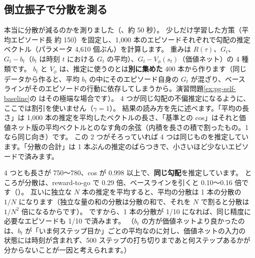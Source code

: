\subsection*{倒立振子で分散を測る}

本当に分散が減るのかを測りました（、約 50 秒）。
少しだけ学習した方策（平均エピソード長 約 150）を固定し、1,000 本のエピソードそれぞれで勾配の推定ベクトル（パラメータ 4,610 個ぶん）を計算します。
重みは $R(\tau)$、$G_t$、$G_t-b_t$（$b_t$ は時刻 $t$ における $G_t$ の平均）、$G_t-V_\phi(s_t)$（価値ネット）の 4 種類です。
$b_t$ と $V_\phi$ は、推定に使うのとは\textbf{別に集めた} 400 本から作ります（同じデータから作ると、平均 $b_t$ の中にそのエピソード自身の $G_t$ が混ざり、ベースラインがそのエピソードの行動に依存してしまうから。演習問題\ref{ex:pg-self-baseline}の  はその極端な場合です）。
4 つが同じ勾配の不偏推定になるように、ここでは割引を使いません（$\gamma=1$）。
結果の読み方を先に述べます。「平均の長さ」は 1,000 本の推定を平均したベクトルの長さ、「基準との cos」はそれと価値ネット版の平均ベクトルとのなす角の余弦（内積を長さの積で割ったもの。1 なら同じ向き）です。
この 2 つがそろっていれば 4 つは同じものを推定しています。「分散の合計」は 1 本ぶんの推定のばらつきで、小さいほど少ないエピソードで済みます。


4 つとも長さが 750〜780、cos が 0.998 以上で、\textbf{同じ勾配}を推定しています。
ところが分散は、reward-to-go で 0.29 倍、ベースラインを引くと 0.10〜0.16 倍です（）。
互いに独立な $N$ 本の推定を平均すると、平均の分散は 1 本の分散の $1/N$ になります（独立な量の和の分散は分散の和で、それを $N$ で割ると分散は $1/N^2$ 倍になるからです）。
ですから、1 本の分散が 1/10 になれば、同じ精度に必要なエピソードも 1/10 で済みます。
（$b_t$ の方が価値ネットより良かったのは、$b_t$ が「いま何ステップ目か」ごとの平均なのに対し、価値ネットの入力の状態には時刻が含まれず、500 ステップの打ち切りまであと何ステップあるかが分からないことが一因と考えられます。）

